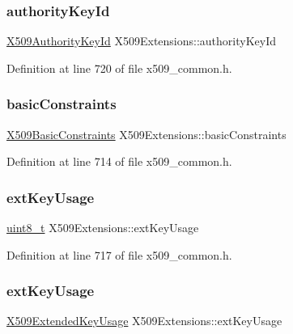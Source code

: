 \subsubsection{\texorpdfstring{authority\+Key\+Id}{authorityKeyId}}
{\footnotesize\ttfamily \hyperlink{structX509AuthorityKeyId}{X509\+Authority\+Key\+Id} X509\+Extensions\+::authority\+Key\+Id}



Definition at line 720 of file x509\+\_\+common.\+h.

\mbox{\label{structX509Extensions_ab06800e3424608f8d652ff23c5a027a9}} 
\subsubsection{\texorpdfstring{basic\+Constraints}{basicConstraints}}
{\footnotesize\ttfamily \hyperlink{structX509BasicConstraints}{X509\+Basic\+Constraints} X509\+Extensions\+::basic\+Constraints}



Definition at line 714 of file x509\+\_\+common.\+h.

\mbox{\label{structX509Extensions_afad9dec97dd6bba0297e67efd46ff042}} 
\subsubsection{\texorpdfstring{ext\+Key\+Usage}{extKeyUsage}\hspace{0.1cm}{\footnotesize\ttfamily [1/2]}}
{\footnotesize\ttfamily \hyperlink{stdint_8h_aba7bc1797add20fe3efdf37ced1182c5}{uint8\+\_\+t} X509\+Extensions\+::ext\+Key\+Usage}



Definition at line 717 of file x509\+\_\+common.\+h.

\mbox{\label{structX509Extensions_a2822396916915df0ec3a666c546e02e1}} 
\subsubsection{\texorpdfstring{ext\+Key\+Usage}{extKeyUsage}\hspace{0.1cm}{\footnotesize\ttfamily [2/2]}}
{\footnotesize\ttfamily \hyperlink{structX509ExtendedKeyUsage}{X509\+Extended\+Key\+Usage} X509\+Extensions\+::ext\+Key\+Usage}




